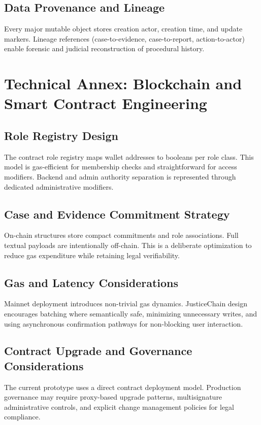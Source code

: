 \documentclass[conference]{IEEEtran}
\begin{document}
\subsection{Data Provenance and Lineage}
Every major mutable object stores creation actor, creation time, and update markers. Lineage references (case-to-evidence, case-to-report, action-to-actor) enable forensic and judicial reconstruction of procedural history.

\section{Technical Annex: Blockchain and Smart Contract Engineering}
\subsection{Role Registry Design}
The contract role registry maps wallet addresses to booleans per role class. This model is gas-efficient for membership checks and straightforward for access modifiers. Backend and admin authority separation is represented through dedicated administrative modifiers.

\subsection{Case and Evidence Commitment Strategy}
On-chain structures store compact commitments and role associations. Full textual payloads are intentionally off-chain. This is a deliberate optimization to reduce gas expenditure while retaining legal verifiability.

\subsection{Gas and Latency Considerations}
Mainnet deployment introduces non-trivial gas dynamics. JusticeChain design encourages batching where semantically safe, minimizing unnecessary writes, and using asynchronous confirmation pathways for non-blocking user interaction.

\subsection{Contract Upgrade and Governance Considerations}
The current prototype uses a direct contract deployment model. Production governance may require proxy-based upgrade patterns, multisignature administrative controls, and explicit change management policies for legal compliance.
\end{document}
